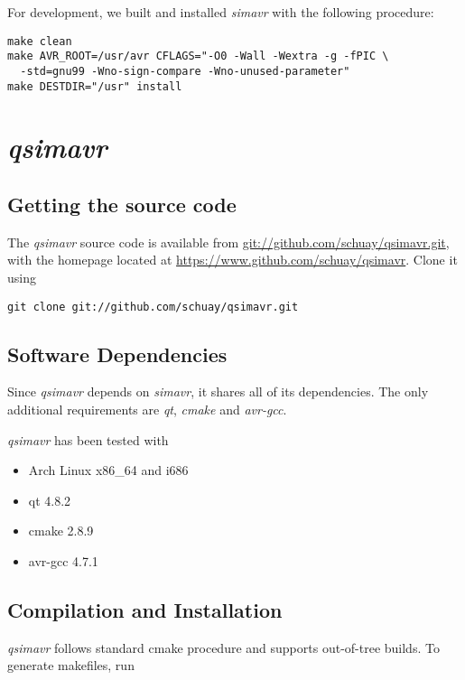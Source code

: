 For development, we built and installed \emph{simavr} with the following procedure:

\begin{verbatim}
make clean
make AVR_ROOT=/usr/avr CFLAGS="-O0 -Wall -Wextra -g -fPIC \
  -std=gnu99 -Wno-sign-compare -Wno-unused-parameter"
make DESTDIR="/usr" install
\end{verbatim}

\section{\emph{qsimavr}}

\subsection{Getting the source code}

The \emph{qsimavr} source code is available from
\url{git://github.com/schuay/qsimavr.git}, with the homepage located at
\url{https://www.github.com/schuay/qsimavr}. Clone it using

\begin{verbatim}
git clone git://github.com/schuay/qsimavr.git
\end{verbatim}

\subsection{Software Dependencies}

Since \emph{qsimavr} depends on \emph{simavr}, it shares all of its dependencies. The only
additional requirements are \emph{qt}, \emph{cmake} and \emph{avr-gcc}.

\emph{qsimavr} has been tested with

\begin{itemize}
\item Arch Linux x86\_64 and i686
\item qt 4.8.2
\item cmake 2.8.9
\item avr-gcc 4.7.1
\end{itemize}

\subsection{Compilation and Installation}

\emph{qsimavr} follows standard cmake procedure and supports out-of-tree builds. To
generate makefiles, run

